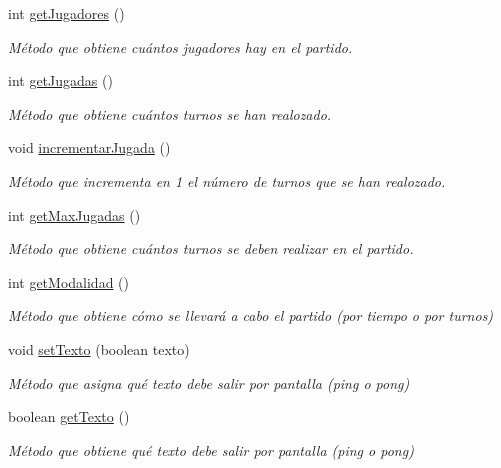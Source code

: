 \begin{DoxyCompactItemize}
int \hyperlink{class_practica4_1_1_pelota_a1149eb47d7a21c21710d00e5c223e527}{get\+Jugadores} ()
\begin{DoxyCompactList}\small\item\em Método que obtiene cuántos jugadores hay en el partido. \end{DoxyCompactList}\item 
int \hyperlink{class_practica4_1_1_pelota_ad72f2a2d2a0b26f3b19ace9ed6cf65d3}{get\+Jugadas} ()
\begin{DoxyCompactList}\small\item\em Método que obtiene cuántos turnos se han realozado. \end{DoxyCompactList}\item 
void \hyperlink{class_practica4_1_1_pelota_add2d52594c65fce854d719668d923721}{incrementar\+Jugada} ()
\begin{DoxyCompactList}\small\item\em Método que incrementa en 1 el número de turnos que se han realozado. \end{DoxyCompactList}\item 
int \hyperlink{class_practica4_1_1_pelota_ad9423a6e3d425befd4c6809f0a7739a3}{get\+Max\+Jugadas} ()
\begin{DoxyCompactList}\small\item\em Método que obtiene cuántos turnos se deben realizar en el partido. \end{DoxyCompactList}\item 
int \hyperlink{class_practica4_1_1_pelota_aee2a61575064881875d6bcfc836f4fa9}{get\+Modalidad} ()
\begin{DoxyCompactList}\small\item\em Método que obtiene cómo se llevará a cabo el partido (por tiempo o por turnos) \end{DoxyCompactList}\item 
void \hyperlink{class_practica4_1_1_pelota_aca64e664ed97d572b2965dad0f3a6b7c}{set\+Texto} (boolean texto)
\begin{DoxyCompactList}\small\item\em Método que asigna qué texto debe salir por pantalla (ping o pong) \end{DoxyCompactList}\item 
boolean \hyperlink{class_practica4_1_1_pelota_ac45780f814a1c62684087f68a18b6f1e}{get\+Texto} ()
\begin{DoxyCompactList}\small\item\em Método que obtiene qué texto debe salir por pantalla (ping o pong) \end{DoxyCompactList}\end{DoxyCompactItemize}



